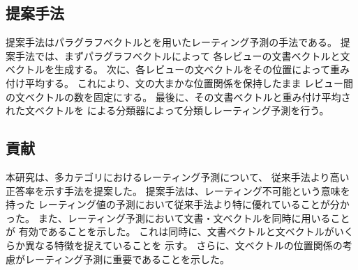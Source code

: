 \subsection{提案手法}

提案手法はパラグラフベクトルと\nn を用いたレーティング予測の手法である。
提案手法では、まずパラグラフベクトル\cite{quoc14}によって
各レビューの文書ベクトルと文ベクトルを生成する。
次に、各レビューの文ベクトルをその位置によって重み付け平均する。
これにより、文の大まかな位置関係を保持したまま
レビュー間の文ベクトルの数を固定にする。
最後に、その文書ベクトルと重み付け平均された文ベクトルを
\nn による分類器によって分類しレーティング予測を行う。


\subsection{貢献}

本研究は、多カテゴリにおけるレーティング予測について、
従来手法\cite{fujitani15}より高い正答率を示す手法を提案した。
提案手法は、レーティング不可能という意味を持った
レーティング値の予測において従来手法より特に優れていることが分かった。
また、レーティング予測において文書・文ベクトルを同時に用いることが
有効であることを示した。
これは同時に、文書ベクトルと文ベクトルがいくらか異なる特徴を捉えていることを
示す。
さらに、文ベクトルの位置関係の考慮がレーティング予測に重要であることを示した。


%
